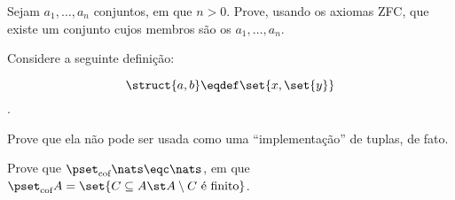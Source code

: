\begin{exercise}
    Sejam $a_1, \dots, a_n$ conjuntos, em que $n>0$. Prove, usando os axiomas ZFC, que existe um conjunto 
    cujos membros são os $a_1, \dots, a_n$.
\end{exercise}

\begin{exercise}
    Considere a seguinte definição:

    $$\struct{a,b} \eqdef \set{x, \set{y}}$$.

    Prove que ela não pode ser usada como uma ``implementação'' de tuplas, de fato.
\end{exercise}

\begin{exercise}
Prove que $\pset_{\text{cof}}\nats \eqc \nats$, em que $\pset_{\text{cof}} A = \set{C \subseteq A \st A\setminus C \text{ é finito}}$.
\end{exercise}